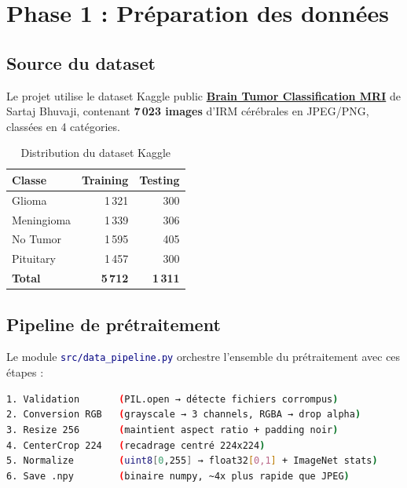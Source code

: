 \documentclass[11pt,a4paper,oneside]{report}
\newcommand{\code}[1]{\texttt{\textcolor{navy}{#1}}}
\begin{document}
\chapter{Phase 1 : Préparation des données}

\section{Source du dataset}

Le projet utilise le dataset Kaggle public \href{https://www.kaggle.com/datasets/sartajbhuvaji/brain-tumor-classification-mri}{\textbf{Brain Tumor Classification MRI}} de Sartaj Bhuvaji, contenant \textbf{7\,023 images} d'IRM cérébrales en JPEG/PNG, classées en 4 catégories.

\begin{table}[!htbp]
\centering
\caption{Distribution du dataset Kaggle}
\begin{tabular}{lrr}
\toprule
\textbf{Classe} & \textbf{Training} & \textbf{Testing} \\
\midrule
Glioma      & 1\,321 & 300 \\
Meningioma  & 1\,339 & 306 \\
No Tumor    & 1\,595 & 405 \\
Pituitary   & 1\,457 & 300 \\
\midrule
\textbf{Total} & \textbf{5\,712} & \textbf{1\,311} \\
\bottomrule
\end{tabular}
\end{table}

\section{Pipeline de prétraitement}

Le module \code{src/data\_pipeline.py} orchestre l'ensemble du prétraitement avec ces étapes :

\begin{lstlisting}[language=Bash, caption={Étapes du prétraitement}]
1. Validation       (PIL.open → détecte fichiers corrompus)
2. Conversion RGB   (grayscale → 3 channels, RGBA → drop alpha)
3. Resize 256       (maintient aspect ratio + padding noir)
4. CenterCrop 224   (recadrage centré 224x224)
5. Normalize        (uint8[0,255] → float32[0,1] + ImageNet stats)
6. Save .npy        (binaire numpy, ~4x plus rapide que JPEG)
\end{lstlisting}
\end{document}
